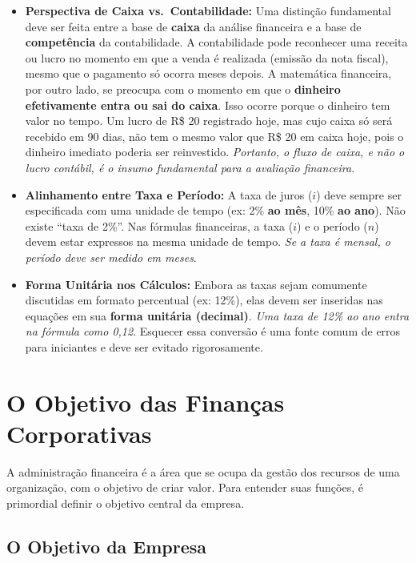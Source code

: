 \documentclass[
  a4paper,
]{book}
\begin{document}
\begin{tcolorbox}
\begin{itemize}
\item
  \textbf{Perspectiva de Caixa vs.~Contabilidade:} Uma distinção
  fundamental deve ser feita entre a base de \textbf{caixa} da análise
  financeira e a base de \textbf{competência} da contabilidade. A
  contabilidade pode reconhecer uma receita ou lucro no momento em que a
  venda é realizada (emissão da nota fiscal), mesmo que o pagamento só
  ocorra meses depois. A matemática financeira, por outro lado, se
  preocupa com o momento em que o \textbf{dinheiro efetivamente entra ou
  sai do caixa}. Isso ocorre porque o dinheiro tem valor no tempo. Um
  lucro de R\$ 20 registrado hoje, mas cujo caixa só será recebido em 90
  dias, não tem o mesmo valor que R\$ 20 em caixa hoje, pois o dinheiro
  imediato poderia ser reinvestido. \emph{Portanto, o fluxo de caixa, e
  não o lucro contábil, é o insumo fundamental para a avaliação
  financeira}.
\item
  \textbf{Alinhamento entre Taxa e Período:} A taxa de juros (\(i\))
  deve sempre ser especificada com uma unidade de tempo (ex: 2\%
  \textbf{ao mês}, 10\% \textbf{ao ano}). Não existe ``taxa de 2\%''.
  Nas fórmulas financeiras, a taxa (\(i\)) e o período (\(n\)) devem
  estar expressos na mesma unidade de tempo. \emph{Se a taxa é mensal, o
  período deve ser medido em meses}.
\item
  \textbf{Forma Unitária nos Cálculos:} Embora as taxas sejam comumente
  discutidas em formato percentual (ex: 12\%), elas devem ser inseridas
  nas equações em sua \textbf{forma unitária (decimal)}. \emph{Uma taxa
  de 12\% ao ano entra na fórmula como 0,12}. Esquecer essa conversão é
  uma fonte comum de erros para iniciantes e deve ser evitado
  rigorosamente.
\end{itemize}

\end{tcolorbox}

\section{O Objetivo das Finanças
Corporativas}\label{o-objetivo-das-finanuxe7as-corporativas}

A administração financeira é a área que se ocupa da gestão dos recursos
de uma organização, com o objetivo de criar valor. Para entender suas
funções, é primordial definir o objetivo central da empresa.

\subsection{O Objetivo da Empresa}\label{o-objetivo-da-empresa}
\end{document}
